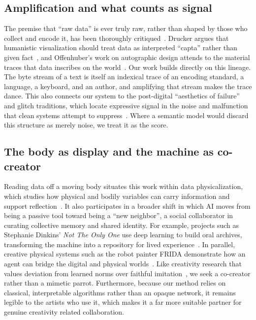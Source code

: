 \documentclass{vgtc}                          %
\begin{document}
\subsection{Amplification and what counts as signal}
The premise that ``raw data'' is ever truly raw, rather than shaped by those who
collect and encode it, has been thoroughly
critiqued~\cite{gitelman2013rawdata,dignazio2020datafeminism}. Drucker argues that
humanistic visualization should treat data as interpreted ``capta'' rather than
given fact~\cite{drucker2011humanities}, and Offenhuber's work on autographic
design attends to the material traces that data inscribes on the
world~\cite{offenhuber2023autographic}. Our work builds directly on this lineage.
The byte stream of a text is itself an indexical trace of an encoding standard, a
language, a keyboard, and an author, and amplifying that stream makes the trace
dance. This also connects our system to the post-digital ``aesthetics of failure''
and glitch traditions, which locate expressive signal in the noise and malfunction
that clean systems attempt to
suppress~\cite{cascone2000aesthetics,menkman2011glitch,church2017musicglitch,wallace2024breakingfromreality}.
Where a semantic model would discard this structure as merely noise, we treat it as the score.

\subsection{The body as display and the machine as co-creator}
Reading data off a moving body situates this work within data physicalization,
which studies how physical and bodily variables can carry information and support
reflection~\cite{jansen2015physicalization}. It also participates in a broader
shift in which AI moves from being a passive tool toward being a ``new neighbor'',
a social collaborator in curating collective memory and shared identity. For
example, projects such as Stephanie Dinkins' \emph{Not The Only One} use deep
learning to build oral archives, transforming the machine into a repository for
lived experience~\cite{dinkins2018ntoo}. In parallel, creative physical systems
such as the robot painter FRIDA demonstrate how an agent can bridge the digital
and physical worlds~\cite{schaldenbrand2022frida}. Like creativity research that
values deviation from learned norms over faithful
imitation~\cite{boden2004creative,elgammal2017can,jiang2024llmcreativity}, we seek
a co-creator rather than a mimetic parrot. Furthermore, because our method relies
on classical, interpretable algorithms rather than an opaque network, it remains
legible to the artists who use it, which makes it a far more suitable partner for
genuine creativity related collaboration.
\end{document}
